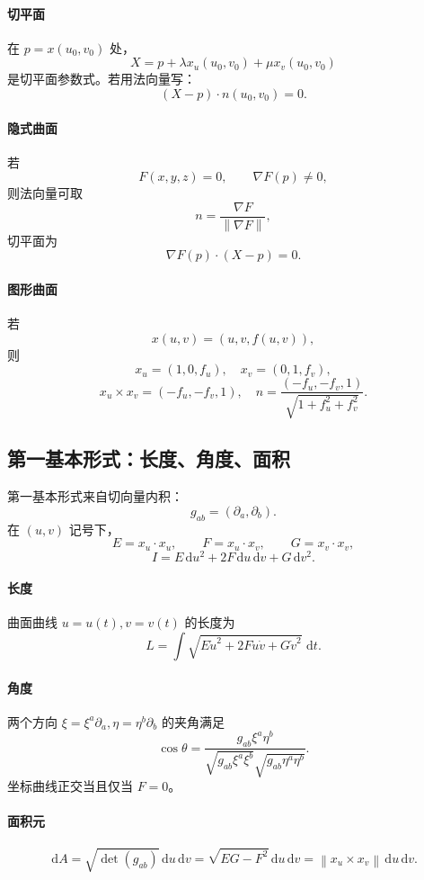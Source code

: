\documentclass[UTF8,12pt,a4paper]{ctexart}
\newcommand{\dd}{\,\mathrm d}
\newcommand{\norm}[1]{\left\lVert #1\right\rVert}
\begin{document}
\paragraph{切平面}
在 $p=x(u_0,v_0)$ 处，
\[
X=p+\lambda x_u(u_0,v_0)+\mu x_v(u_0,v_0)
\]
是切平面参数式。若用法向量写：
\[
(X-p)\cdot n(u_0,v_0)=0.
\]

\paragraph{隐式曲面}
若
\[
F(x,y,z)=0,\qquad \nabla F(p)\ne0,
\]
则法向量可取
\[
n=\frac{\nabla F}{\norm{\nabla F}},
\]
切平面为
\[
\nabla F(p)\cdot(X-p)=0.
\]

\paragraph{图形曲面}
若
\[
x(u,v)=(u,v,f(u,v)),
\]
则
\[
x_u=(1,0,f_u),\quad x_v=(0,1,f_v),
\]
\[
x_u\times x_v=(-f_u,-f_v,1),
\quad
n=\frac{(-f_u,-f_v,1)}{\sqrt{1+f_u^2+f_v^2}}.
\]

\subsection{第一基本形式：长度、角度、面积}

第一基本形式来自切向量内积：
\[
g_{ab}=(\partial_a,\partial_b).
\]
在 $(u,v)$ 记号下，
\[
E=x_u\cdot x_u,\qquad F=x_u\cdot x_v,\qquad G=x_v\cdot x_v,
\]
\[
I=E\dd u^2+2F\dd u\dd v+G\dd v^2.
\]

\paragraph{长度}
曲面曲线 $u=u(t),v=v(t)$ 的长度为
\[
L=\int\sqrt{E\dot u^2+2F\dot u\dot v+G\dot v^2}\,\dd t.
\]

\paragraph{角度}
两个方向 $\xi=\xi^a\partial_a,\eta=\eta^b\partial_b$ 的夹角满足
\[
\cos\theta=
\frac{g_{ab}\xi^a\eta^b}
{\sqrt{g_{ab}\xi^a\xi^b}\sqrt{g_{ab}\eta^a\eta^b}}.
\]
坐标曲线正交当且仅当 $F=0$。

\paragraph{面积元}
\[
\dd A=\sqrt{\det(g_{ab})}\dd u\dd v
=\sqrt{EG-F^2}\dd u\dd v
=\norm{x_u\times x_v}\dd u\dd v.
\]
\end{document}
